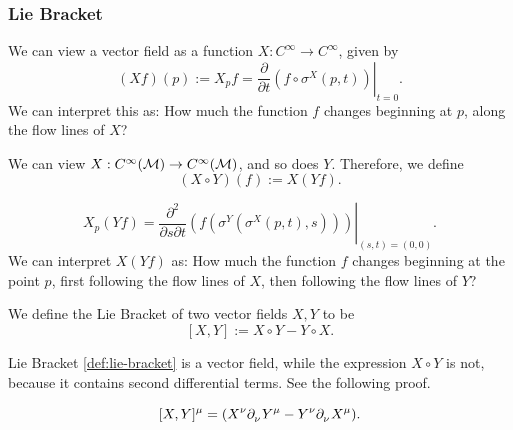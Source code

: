 \documentclass[../main.tex]{subfiles}
\begin{document}
    \subsubsection{Lie Bracket}
    \begin{definition}\label{def:lie-der-function}
        We can view a vector field as a function \(X : C^\infty \to C^\infty\), 
        given by
        \[
        (Xf)(p) := X_pf = \left.\frac{\partial }{\partial t}
        (f\circ \sigma^X(p, t))\right|_{t=0}.
        \]
        We can interpret this as: How much the function \(f\) changes beginning 
        at \(p\), along the flow lines of \(X\)?
    \end{definition}
    \begin{definition}\label{def:vector-field-composition}
        We can view \(X : C^\infty(\manifold[M]) \to C^\infty(\manifold[M])\), 
        and so does \(Y\). Therefore, we define 
        \[
        (X \circ Y)(f) := X(Yf).
        \]
    \end{definition}
    \begin{theorem}\label{thm:vector-field-composition-flow}
        \[
        X_p(Yf) = \left.\frac{\partial ^2}{\partial s\partial t}\left(
            f \left(\sigma^Y \left(\sigma^X(p, t), s\right)\right)
        \right)\right|_{(s, t)=(0, 0)}.
        \]
        We can interpret \(X(Yf)\) as: How much the function \(f\) changes 
        beginning at the point \(p\), first following the flow lines of \(X\), 
        then following the flow lines of \(Y\)?
    \end{theorem}
    \begin{definition}\label{def:lie-bracket}
        We define the Lie Bracket of two vector fields \(X, Y\) to be 
        \[
        [X, Y] := X\circ Y - Y\circ X.
        \]
    \end{definition}
    \begin{remark}
        Lie Bracket \cref{def:lie-bracket} is a vector field, while the 
        expression \(X\circ Y\) is not, because it contains second differential 
        terms. See the following proof.
    \end{remark}
    \begin{theorem}\label{thm:lie-bracket-components}
        \[
        [X, Y]^\mu = (X^\nu\tfld{\nu}Y^\mu - Y^\nu\tfld{\nu}X^\mu).
        \]
    \end{theorem}
\end{document}
